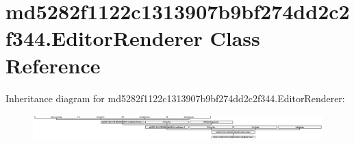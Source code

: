 \hypertarget{classmd5282f1122c1313907b9bf274dd2c2f344_1_1EditorRenderer}{}\section{md5282f1122c1313907b9bf274dd2c2f344.\+Editor\+Renderer Class Reference}
\label{classmd5282f1122c1313907b9bf274dd2c2f344_1_1EditorRenderer}
Inheritance diagram for md5282f1122c1313907b9bf274dd2c2f344.\+Editor\+Renderer\+:\begin{figure}[H]
\begin{center}
\leavevmode
\includegraphics[height=0.980392cm]{classmd5282f1122c1313907b9bf274dd2c2f344_1_1EditorRenderer}
\end{center}
\end{figure}
